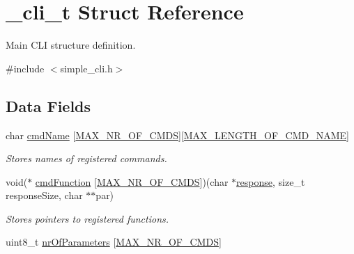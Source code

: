 \hypertarget{struct__cli__t}{\section{\+\_\+cli\+\_\+t Struct Reference}
\label{struct__cli__t}
}


Main C\+L\+I structure definition.  




{\ttfamily \#include $<$simple\+\_\+cli.\+h$>$}

\subsection*{Data Fields}
\begin{DoxyCompactItemize}
\item 
\hypertarget{struct__cli__t_a3179aea6fe53e20e272e45f6921cabc5}{char \hyperlink{struct__cli__t_a3179aea6fe53e20e272e45f6921cabc5}{cmd\+Name} \mbox{[}\hyperlink{group___s_i_m_p_l_e___c_l_i_gac5c0c1eca89291c3464b4ff294b13f05}{M\+A\+X\+\_\+\+N\+R\+\_\+\+O\+F\+\_\+\+C\+M\+D\+S}\mbox{]}\mbox{[}\hyperlink{group___s_i_m_p_l_e___c_l_i_gabd0278272d66be331cab5531626c475d}{M\+A\+X\+\_\+\+L\+E\+N\+G\+T\+H\+\_\+\+O\+F\+\_\+\+C\+M\+D\+\_\+\+N\+A\+M\+E}\mbox{]}}\label{struct__cli__t_a3179aea6fe53e20e272e45f6921cabc5}

\begin{DoxyCompactList}\small\item\em Stores names of registered commands. \end{DoxyCompactList}\item 
\hypertarget{struct__cli__t_a90bde48bbf1f7683b171c00e69d356a9}{void($\ast$ \hyperlink{struct__cli__t_a90bde48bbf1f7683b171c00e69d356a9}{cmd\+Function} \mbox{[}\hyperlink{group___s_i_m_p_l_e___c_l_i_gac5c0c1eca89291c3464b4ff294b13f05}{M\+A\+X\+\_\+\+N\+R\+\_\+\+O\+F\+\_\+\+C\+M\+D\+S}\mbox{]})(char $\ast$\hyperlink{struct__cli__t_a00caea38300895956a4d6b7e90e95232}{response}, size\+\_\+t response\+Size, char $\ast$$\ast$par)}\label{struct__cli__t_a90bde48bbf1f7683b171c00e69d356a9}

\begin{DoxyCompactList}\small\item\em Stores pointers to registered functions. \end{DoxyCompactList}\item 
\hypertarget{struct__cli__t_aeadecdddb1fab1aef408600b88426f92}{uint8\+\_\+t \hyperlink{struct__cli__t_aeadecdddb1fab1aef408600b88426f92}{nr\+Of\+Parameters} \mbox{[}\hyperlink{group___s_i_m_p_l_e___c_l_i_gac5c0c1eca89291c3464b4ff294b13f05}{M\+A\+X\+\_\+\+N\+R\+\_\+\+O\+F\+\_\+\+C\+M\+D\+S}\mbox{]}}\label{struct__cli__t_aeadecdddb1fab1aef408600b88426f92}


\end{DoxyCompactItemize}
